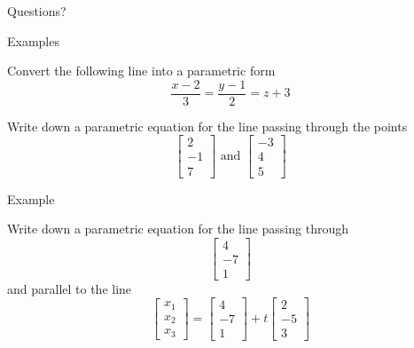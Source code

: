 \documentclass{beamer}
\begin{document}
\begin{frame}
  Questions?
\end{frame}

\begin{frame}{Examples}
  \begin{example}
    Convert the following line into a parametric form
    \begin{equation*}
      \frac{x-2}{3} = \frac{y-1}{2} = z+3
    \end{equation*}
  \end{example}
  \begin{example}
    Write down a parametric equation for the line passing through the points
    \begin{equation*}
      \left[
	\begin{array}{c}
          2\\
          -1\\
          7
	\end{array}
      \right]\text{ and }
      \left[
	\begin{array}{c}
          -3\\
          4\\
          5
	\end{array}
      \right]
    \end{equation*}
  \end{example}
\end{frame}

\begin{frame}{Example}
   \begin{example}
    Write down a parametric equation for the line passing through
    \begin{equation*}
      \left[
	\begin{array}{c}
          4\\
          -7\\
          1
	\end{array}
      \right]
    \end{equation*}
    and parallel to the line
    \begin{equation*}
      \left[
	\begin{array}{c}
          x_1\\
          x_2\\
          x_3
	\end{array}
      \right] = \left[
	\begin{array}{c}
          4\\
          -7\\
          1
	\end{array}
      \right]+t \left[
	\begin{array}{c}
          2\\
          -5\\
          3
	\end{array}
      \right]
    \end{equation*}
  \end{example}
\end{frame}
\end{document}
